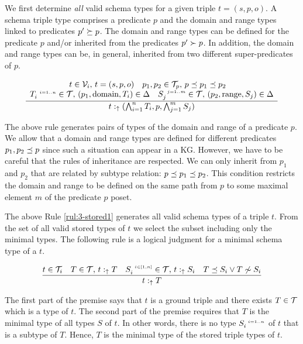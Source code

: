 \documentclass[runningheads]{llncs}
\newcommand{\s}{\scriptscriptstyle\ \,}
\newcommand{\uarr}{\uparrow}
\newcommand{\V}{{\cal V}}
\newcommand{\T}{{\cal T}}
\begin{document}
We first determine \emph{all} valid schema types for a given triple
$t=(s,p,o)$. A schema triple type comprises a predicate $p$ and the domain and range types
linked to predicates $p'\succeq\/p$. The domain and range types can be
defined for the predicate $p$ and/or inherited from the predicates
$p'\succ\/p$. In addition, the domain and range types can be, in
general, inherited from two different super-predicates of $p$.

\begin{equation}
\label{rul:3-stored1}
\dfrac{\begin{array}{c}
       t\in\V_i,\, t=(s,p,o)\quad p_1,p_2\in\T_p,\, p\preceq\/p_1\preceq\/p_2\quad \\
       T_i^{\s\/i=1..n}\in\T,\, (p_1,\text{domain},T_i)\in\/\Delta\quad S_j^{\s\/j=1..m}\in\T,\, (p_2,\text{range},S_j)\in\Delta
       \end{array}}
      {t:_\uarr\/(\bigwedge_{i=1}^n\/T_i, p, \bigwedge_{j=1}^m\/S_j)}
\end{equation}

The above rule generates pairs of types of the domain and range of a
predicate $p$. We allow that a domain and range types are defined for
different predicates $p_1,p_2\preceq\/p$ since such a situation can
appear in a KG. However, we have to be careful that the rules of
inheritance are respected. We can only inherit from $p_1$ and $p_2$
that are related by subtype relation:
$p\preceq\/p_1\preceq\/p_2$. This condition restricts the domain and
range to be defined on the same path from $p$ to some maximal element
$m$ of the predicate $p$ poset. 

The above Rule \ref{rul:3-stored1} generates all valid schema types of
a triple $t$. From the set of all valid stored types of $t$ we select
the subset including only the minimal types. The following rule is a
logical judgment for a minimal schema type of a $t$. 

\begin{equation}
\label{rul:min-stored-type}
\dfrac{t\in\T_i\quad T\in\T,\, t:_\uarr\/T\quad\/S_i^{\s\/i\in[1,n]}\in\T,\, t:_\uarr\/S_i\quad T\preceq\/S_i\lor\/T\not\sim\/S_i}
      {t:_{\uarr}\/T}
\end{equation}

The first part of the premise says that $t$ is a ground triple and there
exists $T\in\T$ which is a type of $t$. The second part of the premise
requires that $T$ is the minimal type of all types $S$ of $t$. In
other words, there is no type $S_i^{\s\/i=1..n}$ of $t$ that is a
subtype of $T$. Hence, $T$ is the minimal type of the stored triple
types of $t$.
\end{document}
